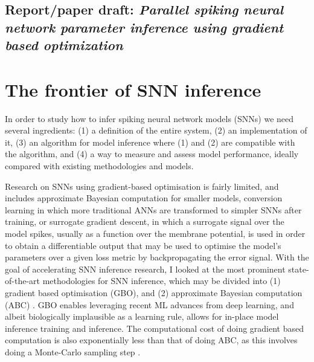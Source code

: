 \documentclass[mphil,deptreport,ianc]{infthesis} %
\begin{document}
\section{Report/paper draft: \textit{Parallel spiking neural network parameter inference using gradient based optimization}}



\chapter{The frontier of SNN inference}\label{chpt:frontier}

In order to study how to infer spiking neural network models (SNNs) we need several ingredients: (1) a definition of the entire system, (2) an implementation of it, (3) an algorithm for model inference where (1) and (2) are compatible with the algorithm, and (4) a way to measure and assess model performance, ideally compared with existing methodologies and models.

Research on SNNs using gradient-based optimisation is fairly limited, and includes approximate Bayesian computation for smaller models, conversion learning in which more traditional ANNs are transformed to simpler SNNs after training, or surrogate gradient descent, in which a surrogate signal over the model spikes, usually as a function over the membrane potential, is used in order to obtain a differentiable output that may be used to optimise the model's parameters over a given loss metric by backpropagating the error signal.
With the goal of accelerating SNN inference research, I looked at the most prominent state-of-the-art methodologies for SNN inference, which may be divided into (1) gradient based optimisation (GBO), and (2) approximate Bayesian computation (ABC) \cite{Lueckmann2018, Rene2020, Cranmer2020a, Lueckmann2021}.
GBO enables leveraging recent ML advances from deep learning, and albeit biologically implausible as a learning rule, allows for in-place model inference training and inference. The computational cost of doing gradient based computation is also exponentially less than that of doing ABC, as this involves doing a Monte-Carlo sampling step \cite{Rene2020}.
\end{document}
